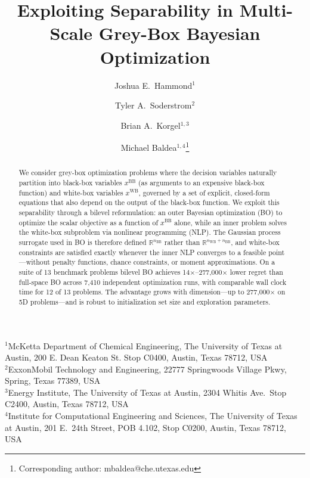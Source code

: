 \documentclass[12pt,a4paper]{article}%
\theoremstyle{plain}%
\theoremstyle{remark}%
\theoremstyle{definition}%
\def\WB{\mathrm{WB}}
\def\BB{\mathrm{BB}}
\begin{document}
\title{Exploiting Separability in Multi-Scale Grey-Box Bayesian Optimization}

\author{Joshua E.\ Hammond$^{1}$ \and Tyler A.\ Soderstrom$^{2}$ \and Brian A.\ Korgel$^{1,3}$ \and Michael Baldea$^{1,4}$\thanks{Corresponding author: mbaldea@che.utexas.edu}}

\date{}

\maketitle

\noindent$^{1}$McKetta Department of Chemical Engineering, The University of Texas at Austin, 200 E. Dean Keaton St. Stop C0400, Austin, Texas 78712, USA\\
$^{2}$ExxonMobil Technology and Engineering, 22777 Springwoods Village Pkwy, Spring, Texas 77389, USA\\
$^{3}$Energy Institute, The University of Texas at Austin, 2304 Whitis Ave.\ Stop C2400, Austin, Texas 78712, USA\\
$^{4}$Institute for Computational Engineering and Sciences, The University of Texas at Austin, 201 E.\ 24th Street, POB 4.102, Stop C0200, Austin, Texas 78712, USA

\bigskip

\begin{abstract}
We consider grey-box optimization problems where the decision variables naturally partition into black-box variables $x^{\BB}$ (as arguments to an expensive black-box function) and white-box variables $x^{\WB}$, governed by a set of explicit, closed-form equations that also depend on the output of the black-box function. We exploit this separability through a bilevel reformulation: an outer Bayesian optimization (BO) to optimize the scalar objective as a function of $x^{\BB}$ alone, while an inner problem solves the white-box subproblem via nonlinear programming (NLP). The Gaussian process surrogate used in BO is therefore defined $\mathbb{R}^{n_{\BB}}$ rather than $\mathbb{R}^{n_{\WB}+n_{\BB}}$, and white-box constraints are satisfied exactly whenever the inner NLP converges to a feasible point---without penalty functions, chance constraints, or moment approximations. On a suite of 13 benchmark problems bilevel BO achieves 14$\times$--277{,}000$\times$ lower regret than full-space BO across 7{,}410 independent optimization runs, with comparable wall clock time for 12 of 13 problems. The advantage grows with dimension---up to 277{,}000$\times$ on 5D problems---and is robust to initialization set size and exploration parameters.
\end{abstract}
\end{document}

